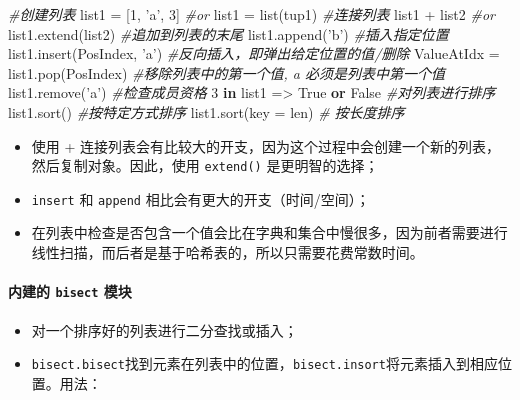 \documentclass[utf-8]{ctexart}
\newenvironment{Shaded}{}{}
\newcommand{\KeywordTok}[1]{\textcolor[rgb]{0.00,0.44,0.13}{\textbf{#1}}}
\newcommand{\DecValTok}[1]{\textcolor[rgb]{0.25,0.63,0.44}{#1}}
\newcommand{\StringTok}[1]{\textcolor[rgb]{0.25,0.44,0.63}{#1}}
\newcommand{\CommentTok}[1]{\textcolor[rgb]{0.38,0.63,0.69}{\textit{#1}}}
\newcommand{\VariableTok}[1]{\textcolor[rgb]{0.10,0.09,0.49}{#1}}
\newcommand{\OperatorTok}[1]{\textcolor[rgb]{0.40,0.40,0.40}{#1}}
\newcommand{\BuiltInTok}[1]{#1}
\newcommand{\NormalTok}[1]{#1}
\let\oldparagraph\paragraph
\renewcommand{\paragraph}[1]{\oldparagraph{#1}\mbox{}}
\begin{document}
\begin{Shaded}
\begin{Highlighting}[]
\CommentTok{#创建列表}
\NormalTok{list1 }\OperatorTok{=}\NormalTok{ [}\DecValTok{1}\NormalTok{, }\StringTok{'a'}\NormalTok{, }\DecValTok{3}\NormalTok{]}
\CommentTok{#or}
\NormalTok{list1 }\OperatorTok{=} \BuiltInTok{list}\NormalTok{(tup1)}
\CommentTok{#连接列表}
\NormalTok{list1 }\OperatorTok{+}\NormalTok{ list2 }
\CommentTok{#or}
\NormalTok{list1.extend(list2)}
\CommentTok{#追加到列表的末尾}
\NormalTok{list1.append(}\StringTok{'b'}\NormalTok{)}
\CommentTok{#插入指定位置}
\NormalTok{list1.insert(PosIndex, }\StringTok{'a'}\NormalTok{)}
\CommentTok{#反向插入，即弹出给定位置的值/删除}
\NormalTok{ValueAtIdx }\OperatorTok{=}\NormalTok{ list1.pop(PosIndex)}
\CommentTok{#移除列表中的第一个值, a 必须是列表中第一个值}
\NormalTok{list1.remove(}\StringTok{'a'}\NormalTok{)}
\CommentTok{#检查成员资格}
\DecValTok{3} \KeywordTok{in}\NormalTok{ list1 }\OperatorTok{=>} \VariableTok{True} \KeywordTok{or} \VariableTok{False}
\CommentTok{#对列表进行排序}
\NormalTok{list1.sort()}
\CommentTok{#按特定方式排序}
\NormalTok{list1.sort(key }\OperatorTok{=} \BuiltInTok{len}\NormalTok{) }\CommentTok{# 按长度排序}
\end{Highlighting}
\end{Shaded}

\begin{itemize}
\item
  使用 +
  连接列表会有比较大的开支，因为这个过程中会创建一个新的列表，然后复制对象。因此，使用
  \texttt{extend()} 是更明智的选择；
\item
  \texttt{insert} 和 \texttt{append} 相比会有更大的开支（时间/空间）；
\item
  在列表中检查是否包含一个值会比在字典和集合中慢很多，因为前者需要进行线性扫描，而后者是基于哈希表的，所以只需要花费常数时间。
\end{itemize}

\paragraph{\texorpdfstring{内建的 \texttt{bisect}
模块}{内建的 bisect 模块}}\label{header-n152}

\begin{itemize}
\item
  对一个排序好的列表进行二分查找或插入；
\item
  \texttt{bisect.bisect}找到元素在列表中的位置，\texttt{bisect.insort}将元素插入到相应位置。用法：
\end{itemize}
\end{document}
